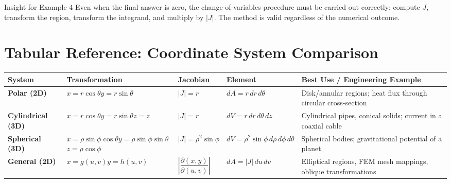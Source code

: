 \documentclass[12pt,a4paper]{article}
\begin{document}
\begin{learnbox}{Insight for Example 4}
Even when the final answer is zero, the change-of-variables procedure must be carried out correctly:
compute $J$, transform the region, transform the integrand, and multiply by $|J|$. The method is
valid regardless of the numerical outcome.
\end{learnbox}

\section{Tabular Reference: Coordinate System Comparison}

\begin{center}
\begin{tabular}{p{2.8cm} p{3.5cm} p{2cm} p{2.5cm} p{3.5cm}}
\toprule
\textbf{System} & \textbf{Transformation} & \textbf{Jacobian} & \textbf{Element} & \textbf{Best Use / Engineering Example} \\
\midrule
\textbf{Polar (2D)} &
  $x = r\cos\theta$\newline $y = r\sin\theta$ &
  $|J| = r$ &
  $dA = r\,dr\,d\theta$ &
  Disk/annular regions; heat flux through circular cross-section \\
\addlinespace
\textbf{Cylindrical (3D)} &
  $x = r\cos\theta$\newline $y = r\sin\theta$\newline $z = z$ &
  $|J| = r$ &
  $dV = r\,dr\,d\theta\,dz$ &
  Cylindrical pipes, conical solids; current in a coaxial cable \\
\addlinespace
\textbf{Spherical (3D)} &
  $x = \rho\sin\phi\cos\theta$\newline $y = \rho\sin\phi\sin\theta$\newline $z = \rho\cos\phi$ &
  $|J| = \rho^2\sin\phi$ &
  $dV = \rho^2\sin\phi\,d\rho\,d\phi\,d\theta$ &
  Spherical bodies; gravitational potential of a planet \\
\addlinespace
\textbf{General (2D)} &
  $x = g(u,v)$\newline $y = h(u,v)$ &
  $\left|\dfrac{\partial(x,y)}{\partial(u,v)}\right|$ &
  $dA = |J|\,du\,dv$ &
  Elliptical regions, FEM mesh mappings, oblique transformations \\
\bottomrule
\end{tabular}
\end{center}

\end{document}
